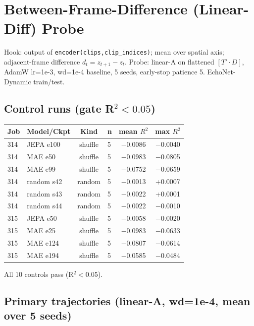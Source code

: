 \documentclass{article}
\begin{document}
\section{Between-Frame-Difference (Linear-Diff) Probe}

Hook: output of \texttt{encoder(clips,clip\_indices)}; mean over spatial axis; adjacent-frame difference $d_t = z_{t+1}-z_t$. Probe: linear-A on flattened $[T'\cdot D]$, AdamW lr=1e-3, wd=1e-4 baseline, 5 seeds, early-stop patience 5. EchoNet-Dynamic train/test.

\subsection{Control runs (gate R$^2<0.05$)}

\begin{center}
\begin{tabular}{llclcc}
\toprule
Job & Model/Ckpt & Kind & n & mean $R^2$ & max $R^2$ \\
\midrule
314 & JEPA e100 & shuffle & 5 & $-$0.0086 & $-$0.0040 \\
314 & MAE e50   & shuffle & 5 & $-$0.0983 & $-$0.0805 \\
314 & MAE e99   & shuffle & 5 & $-$0.0752 & $-$0.0659 \\
314 & random s42 & random & 5 & $-$0.0013 & +0.0007 \\
314 & random s43 & random & 5 & $-$0.0022 & +0.0001 \\
314 & random s44 & random & 5 & $-$0.0022 & $-$0.0010 \\
315 & JEPA e50  & shuffle & 5 & $-$0.0058 & $-$0.0020 \\
315 & MAE e25   & shuffle & 5 & $-$0.0983 & $-$0.0633 \\
315 & MAE e124  & shuffle & 5 & $-$0.0807 & $-$0.0614 \\
315 & MAE e194  & shuffle & 5 & $-$0.0585 & $-$0.0484 \\
\bottomrule
\end{tabular}
\end{center}
All 10 controls pass (R$^2<0.05$).

\subsection{Primary trajectories (linear-A, wd=1e-4, mean over 5 seeds)}
\end{document}
